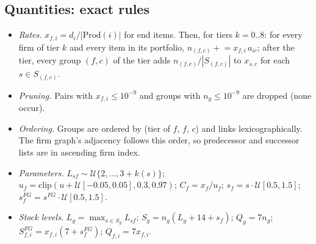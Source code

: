 \documentclass{ifacconf}
\begin{document}
\subsection{Quantities: exact rules}
\begin{itemize}
\item \emph{Rates.} $x_{f,i}=d_i/|\mathrm{Prod}(i)|$ for end items. Then, for tiers $k=0..8$: for every firm of tier $k$ and every item in its portfolio, $n_{(f,c)}\mathrel{+}=x_{f,i}\,a_{ic}$; after the tier, every group $(f,c)$ of the tier adds $n_{(f,c)}/|S_{(f,c)}|$ to $x_{s,c}$ for each $s\in S_{(f,c)}$.
\item \emph{Pruning.} Pairs with $x_{f,i}\le10^{-9}$ and groups with $n_g\le10^{-9}$ are dropped (none occur).
\item \emph{Ordering.} Groups are ordered by (tier of $f$, $f$, $c$) and links lexicographically. The firm graph's adjacency follows this order, so predecessor and successor lists are in ascending firm index.
\item \emph{Parameters.} $L_{sf}\sim\mathcal{U}\{2,\dots,3+k(s)\}$; $u_f=\mathrm{clip}(u+\mathcal{U}[-0.05,0.05],0.3,0.97)$; $C_f=x_f/u_f$; $s_f=s\cdot\mathcal{U}[0.5,1.5]$; $s^{FG}_f=s^{FG}\cdot\mathcal{U}[0.5,1.5]$.
\item \emph{Stock levels.} $L_g=\max_{s\in S_g}L_{sf}$; $S_g=n_g(L_g+14+s_f)$; $Q_g=7n_g$; $S^{FG}_{f,i}=x_{f,i}(7+s^{FG}_f)$; $Q_{f,i}=7x_{f,i}$.
\end{itemize}
\end{document}
